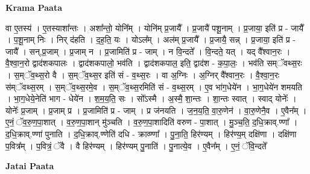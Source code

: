\documentclass[17pt]{extarticle}
\begin{document}
\textbf{Krama Paata} \newline

वा ए॒तस्य॑ । ए॒तस्याशा᳚न्तः । अशा᳚न्तो॒ योनि᳚म् । योनि॑म् प्र॒जायै᳚ । प्र॒जायै॑ पशू॒नाम् । प्र॒जाया॒ इति॑ प्र - जायै᳚ । प॒शू॒नाम् निः । निर् द॑हति । द॒ह॒ति॒ यः । योऽल᳚म् । अल॑म् प्र॒जायै᳚ । प्र॒जायै॒ सन्न् । प्र॒जाया॒ इति॑ प्र - जायै᳚ । सन्,प्र॒जाम् । प्र॒जाम् न । प्र॒जामिति॑ प्र - जाम् । न वि॒न्दते᳚ । वि॒न्दते॒ यत् । यद् वै᳚श्वान॒रः । वै॒श्वा॒न॒रो द्वाद॑शकपालः । द्वाद॑शकपालो॒ भव॑ति । द्वाद॑शकपाल॒ इति॒ द्वाद॑श - क॒पा॒लः॒ । भव॑ति सम्ॅवथ्स॒रः । स॒म्ॅव॒थ्स॒रो वै । स॒म्ॅव॒थ्स॒र इति॑ सं - व॒थ्स॒रः । वा अ॒ग्निः । अ॒ग्निर् वै᳚श्वान॒रः । वै॒श्वा॒न॒रः स॑म्ॅवथ्स॒रम् । स॒म्ॅव॒थ्स॒रमे॒व । स॒म्ॅव॒थ्स॒रमिति॑ सं - व॒थ्स॒रम् । ए॒व भा॑ग॒धेये॑न । भा॒ग॒धेये॑न शमयति । भा॒ग॒धेये॒नेति॑ भाग - धेये॑न । श॒म॒य॒ति॒ सः । सो᳚ऽस्मै । अ॒स्मै॒ शा॒न्तः । शा॒न्तः स्वात् । स्वाद् योनेः᳚ । योनेः᳚ प्र॒जाम् । प्र॒जाम् प्र । प्र॒जामिति॑ प्र - जाम् । प्र ज॑नयति । ज॒न॒य॒ति॒ वा॒रु॒णेन॑ । वा॒रु॒णेनै॒व । ए॒वैन᳚म् । ए॒नं॒ ॅव॒रु॒ण॒पा॒शात् । व॒रु॒ण॒पा॒शान् मु॑ञ्चति । व॒रु॒ण॒पा॒शादिति॑ वरुण - पा॒शात् । मु॒ञ्च॒ति॒ द॒धि॒क्राव्.ण्णा᳚ । द॒धि॒क्राव्.ण्णा॑ पुनाति । द॒धि॒क्राव्.ण्णेति॑ दधि - क्राव्ण्णा᳚ । पु॒ना॒ति॒ हिर॑ण्यम् । हिर॑ण्य॒म् दक्षि॑णा । दक्षि॑णा प॒वित्र᳚म् । प॒वित्रं॒ ॅवै । वै हिर॑ण्यम् । हिर॑ण्यम् पु॒नाति॑ । पु॒नात्ये॒व । ए॒वैन᳚म् । ए॒नं॒ ॅवि॒न्दते᳚ \newline

\textbf{Jatai Paata} \newline
\end{document}
